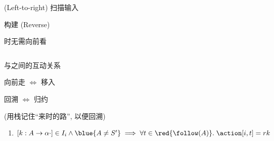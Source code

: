 \begin{frame}{}
  \begin{center}

    \vspace{0.80cm}
    \begin{columns}
        \begin{description}
          \setlength{\itemsep}{15pt}
          \item[$L:$]  (Left-to-right) 扫描输入
          \item[$R:$] 构建 (Reverse) 
          \item[$0:$] 时无需向前看
        \end{description}
    \end{columns}
  \end{center}
\end{frame}

\begin{frame}{}
  \begin{center}
    与之间的互动关系

    \vspace{0.80cm}
    向前走 $\Leftrightarrow$ 移入

    \vspace{0.50cm}
    回溯   $\Leftrightarrow$ 归约

    \vspace{1.00cm}

    \vspace{0.20cm}
    (用栈记住``来时的路'', 以便回溯)
  \end{center}
\end{frame}

\begin{frame}{}
  \begin{center}


    \begin{enumerate}[(3)]
      \centering
      \item $[k: A \to \alpha \cdot] \in I_{i} \land \blue{A \neq S'} \implies
        \forall t \in \red{\follow(A)}.\; \action[i, t] = rk$
    \end{enumerate}
  \end{center}
\end{frame}

